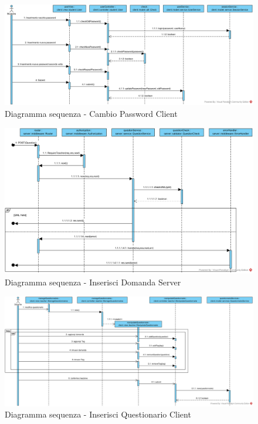 \documentclass[12pt,a4paper]{article}
\begin{document}
\begin{center}
	\begin{figure}[H]
		\centering \includegraphics[max width=\myheight, angle=90 ]{../img/diagrammiSequenza/cambioPasswordClient.png}
		\caption{Diagramma sequenza - Cambio Password Client}
	\end{figure}
\end{center}


\begin{center}
	\begin{figure}[H]
		\centering \includegraphics[max width=\myheight, angle=90 ]{../img/diagrammiSequenza/inserisciDomandaServer.png}
		\caption{Diagramma sequenza - Inserisci Domanda Server}
	\end{figure}

\end{center}

\begin{center}
	\begin{figure}[H]
		\centering \includegraphics[max width=\myheight, angle=90 ]{../img/diagrammiSequenza/inserisciQuestionarioClient.png}
		\caption{Diagramma sequenza - Inserisci Questionario Client}
	\end{figure}

\end{center}
\end{document}
